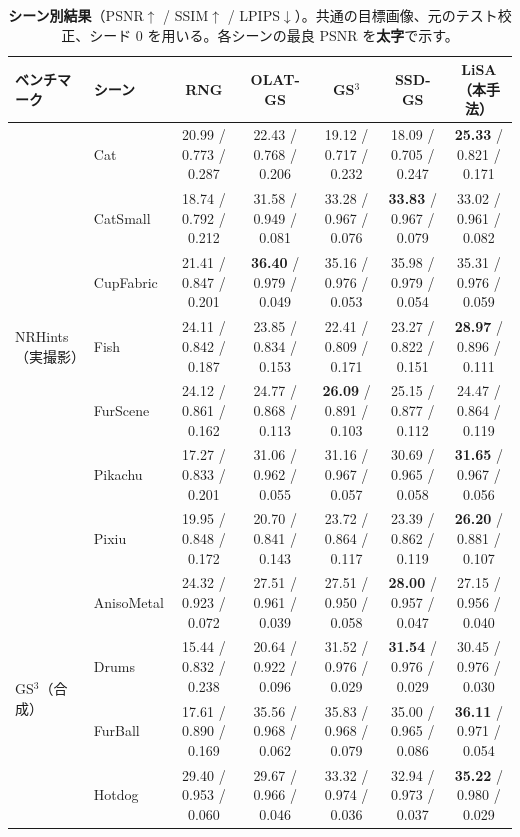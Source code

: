 \begin{table}[t]
\caption{\textbf{シーン別結果}（PSNR$\uparrow$ / SSIM$\uparrow$ / LPIPS$\downarrow$）。共通の目標画像、元のテスト校正、シード 0 を用いる。各シーンの最良 PSNR を\textbf{太字}で示す。}
\label{tab:perscene}
\centering\scriptsize
\setlength{\tabcolsep}{3pt}
\begin{tabular}{@{}llccccc@{}}
\toprule
ベンチマーク & シーン & RNG & OLAT-GS & GS$^3$ & SSD-GS & \textbf{LiSA（本手法）} \\
\midrule
\multirow{7}{*}{NRHints（実撮影）} & Cat & 20.99 / 0.773 / 0.287 & 22.43 / 0.768 / 0.206 & 19.12 / 0.717 / 0.232 & 18.09 / 0.705 / 0.247 & \textbf{25.33} / 0.821 / 0.171 \\
 & CatSmall & 18.74 / 0.792 / 0.212 & 31.58 / 0.949 / 0.081 & 33.28 / 0.967 / 0.076 & \textbf{33.83} / 0.967 / 0.079 & 33.02 / 0.961 / 0.082 \\
 & CupFabric & 21.41 / 0.847 / 0.201 & \textbf{36.40} / 0.979 / 0.049 & 35.16 / 0.976 / 0.053 & 35.98 / 0.979 / 0.054 & 35.31 / 0.976 / 0.059 \\
 & Fish & 24.11 / 0.842 / 0.187 & 23.85 / 0.834 / 0.153 & 22.41 / 0.809 / 0.171 & 23.27 / 0.822 / 0.151 & \textbf{28.97} / 0.896 / 0.111 \\
 & FurScene & 24.12 / 0.861 / 0.162 & 24.77 / 0.868 / 0.113 & \textbf{26.09} / 0.891 / 0.103 & 25.15 / 0.877 / 0.112 & 24.47 / 0.864 / 0.119 \\
 & Pikachu & 17.27 / 0.833 / 0.201 & 31.06 / 0.962 / 0.055 & 31.16 / 0.967 / 0.057 & 30.69 / 0.965 / 0.058 & \textbf{31.65} / 0.967 / 0.056 \\
 & Pixiu & 19.95 / 0.848 / 0.172 & 20.70 / 0.841 / 0.143 & 23.72 / 0.864 / 0.117 & 23.39 / 0.862 / 0.119 & \textbf{26.20} / 0.881 / 0.107 \\
\midrule
\multirow{6}{*}{GS$^3$（合成）} & AnisoMetal & 24.32 / 0.923 / 0.072 & 27.51 / 0.961 / 0.039 & 27.51 / 0.950 / 0.058 & \textbf{28.00} / 0.957 / 0.047 & 27.15 / 0.956 / 0.040 \\
 & Drums & 15.44 / 0.832 / 0.238 & 20.64 / 0.922 / 0.096 & 31.52 / 0.976 / 0.029 & \textbf{31.54} / 0.976 / 0.029 & 30.45 / 0.976 / 0.030 \\
 & FurBall & 17.61 / 0.890 / 0.169 & 35.56 / 0.968 / 0.062 & 35.83 / 0.968 / 0.079 & 35.00 / 0.965 / 0.086 & \textbf{36.11} / 0.971 / 0.054 \\
 & Hotdog & 29.40 / 0.953 / 0.060 & 29.67 / 0.966 / 0.046 & 33.32 / 0.974 / 0.036 & 32.94 / 0.973 / 0.037 & \textbf{35.22} / 0.980 / 0.029 \\

\end{tabular}
\end{table}

